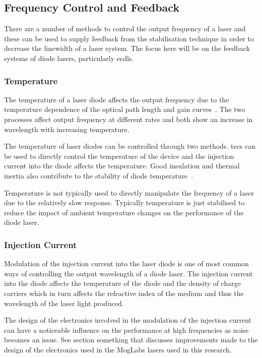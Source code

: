 \subsection{Frequency Control and Feedback}

There are a number of methods to control the output frequency of a laser and these can be used to supply feedback from the stabilisation technique in order to decrease the linewidth of a laser system.
The focus here will be on the feedback systems of diode lasers, particularly \glspl{ecdl}.

\subsubsection{Temperature}
The temperature of a laser diode affects the output frequency due to the temperature dependence of the optical path length and gain curves~\cite{wieman_using_1991}.
The two processes affect output frequency at different rates and both show an increase in wavelength with increasing temperature.

The temperature of laser diodes can be controlled through two methods. \Glspl{tec} can be used to directly control the temperature of the device and the injection current into the diode affects the temperature. Good insulation and thermal inertia also contribute to the stability of diode temperature~\cite{saliba_cold_2011}.

Temperature is not typically used to directly manipulate the frequency of a laser due to the relatively slow response.
Typically temperature is just stabilised to reduce the impact of ambient temperature changes on the performance of the diode laser.

\subsubsection{Injection Current}
Modulation of the injection current into the laser diode is one of most common ways of controlling the output wavelength of a diode laser.
The injection current into the diode affects the temperature of the diode and the density of charge carriers which in turn affects the refractive index of the medium and thus the wavelength of the laser light produced.

The design of the electronics involved in the modulation of the injection current can have a noticeable influence on the performance at high frequencies as noise becomes an issue.
{\color{red}See section something that discusses improvements made to the design of the electronics used in the MogLabs lasers used in this research.}

